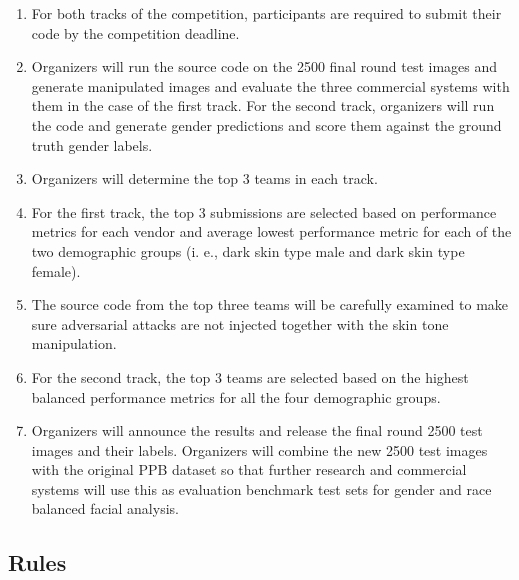 \documentclass[11pt, oneside]{article}
\begin{document}
\begin{enumerate}
    \item For both tracks of the competition, participants are required to 
    submit their code by the competition deadline.
    \item Organizers will run the source code on the 2500 final round test 
    images and generate manipulated images and evaluate the three commercial 
    systems with them in the case of the first track. For the second track, 
    organizers will run the code and generate gender predictions and score them 
    against the ground truth gender labels.
    \item Organizers will determine the top 3 teams in each track.
    \item For the first track, the top 3 submissions are selected based on 
    performance metrics for each vendor and average lowest performance metric 
    for each of the two demographic groups (i. e., dark skin type male and dark 
    skin type female).
    \item The source code from the top three teams will be carefully examined 
    to make sure adversarial attacks are not injected together with the skin 
    tone manipulation.
    \item For the second track, the top 3 teams are selected based on the 
    highest balanced performance metrics for all the four demographic groups.
    \item Organizers will announce the results and release the final round 2500 
    test images and their labels. Organizers will combine the new 2500 test 
    images with the original PPB dataset so that further research and 
    commercial systems will use this as evaluation benchmark test sets for 
    gender and race balanced facial analysis.
\end{enumerate}


\subsection{Rules}
\end{document}
